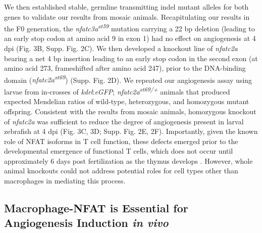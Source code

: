 We then established stable, germline transmitting indel mutant alleles for both genes to validate our results from mosaic animals. Recapitulating our results in the F0 generation, the \textit{nfatc3a\textsuperscript{xt59}} mutation carrying a 22 bp deletion (leading to an early stop codon at amino acid 9 in exon 1) had no effect on angiogenesis at 4 dpi (Fig. 3B, Supp. Fig. 2C). We then developed a knockout line of \textit{nfatc2a} bearing a net 4 bp insertion leading to an early stop codon in the second exon (at amino acid 273, frameshifted after amino acid 247), prior to the DNA-binding domain (\textit{nfatc2a\textsuperscript{xt69}}) (Supp. Fig. 2D). We repeated our angiogenesis assay using larvae from in-crosses of \textit{kdrl}:\textit{eGFP}; \textit{nfatc2a\textsuperscript{xt69/+}} animals that produced expected Mendelian ratios of wild-type, heterozygous, and homozygous mutant offspring. Consistent with the results from mosaic animals, homozygous knockout of \textit{nfatc2a} was sufficient to reduce the degree of angiogenesis present in larval zebrafish at 4 dpi (Fig. 3C, 3D; Supp. Fig. 2E, 2F). Importantly, given the known role of NFAT isoforms in T cell function, these defects emerged prior to the developmental emergence of functional T cells, which does not occur until approximately 6 days post fertilization as the thymus develops \citep{Trede2004}. However, whole animal knockouts could not address potential roles for cell types other than macrophages in mediating this process. 

\subsection{Macrophage-NFAT is Essential for Angiogenesis Induction \textit{in vivo}}

